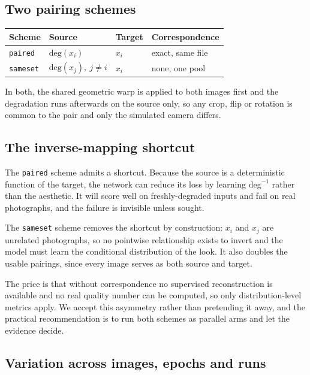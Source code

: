 \documentclass[11pt,a4paper]{article}
\newcommand{\code}[1]{\texttt{#1}}
\begin{document}
\subsection{Two pairing schemes}

\begin{center}
\begin{tabular}{@{}llll@{}}
\toprule
Scheme & Source & Target & Correspondence \\
\midrule
\code{paired}  & $\mathrm{deg}(x_i)$ & $x_i$ & exact, same file \\
\code{sameset} & $\mathrm{deg}(x_j),\ j \neq i$ & $x_i$ & none, one pool \\
\bottomrule
\end{tabular}
\end{center}

In both, the shared geometric warp is applied to both images first and the
degradation runs afterwards on the source only, so any crop, flip or rotation is
common to the pair and only the simulated camera differs.

\subsection{The inverse-mapping shortcut}

The \code{paired} scheme admits a shortcut. Because the source is a deterministic
function of the target, the network can reduce its loss by learning
$\mathrm{deg}^{-1}$ rather than the aesthetic. It will score well on
freshly-degraded inputs and fail on real photographs, and the failure is invisible
unless sought.

The \code{sameset} scheme removes the shortcut by construction: $x_i$ and $x_j$
are unrelated photographs, so no pointwise relationship exists to invert and the
model must learn the conditional distribution of the look. It also doubles the
usable pairings, since every image serves as both source and target.

The price is that without correspondence no supervised reconstruction is
available and no real quality number can be computed, so only distribution-level
metrics apply. We accept this asymmetry rather than pretending it away, and the
practical recommendation is to run both schemes as parallel arms and let the
evidence decide.

\subsection{Variation across images, epochs and runs}
\end{document}
